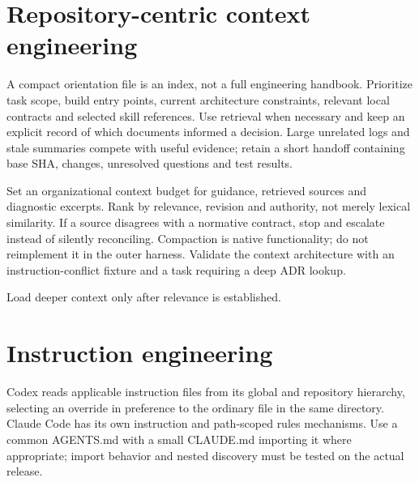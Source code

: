 \documentclass[11pt,letterpaper]{article}
\begin{document}
\section{Repository-centric context engineering}
A compact orientation file is an index, not a full engineering handbook. Prioritize task scope, build entry points, current architecture constraints, relevant local contracts and selected skill references. Use retrieval when necessary and keep an explicit record of which documents informed a decision. Large unrelated logs and stale summaries compete with useful evidence; retain a short handoff containing base SHA, changes, unresolved questions and test results.

Set an organizational context budget for guidance, retrieved sources and diagnostic excerpts. Rank by relevance, revision and authority, not merely lexical similarity. If a source disagrees with a normative contract, stop and escalate instead of silently reconciling. Compaction is native functionality; do not reimplement it in the outer harness. Validate the context architecture with an instruction-conflict fixture and a task requiring a deep ADR lookup.

\begin{center}\begin{minipage}{\linewidth}\captionsetup{type=figure}\centering{}\caption{Progressive disclosure lifecycle}
\small Load deeper context only after relevance is established.\end{minipage}\end{center}
\section{Instruction engineering}
Codex reads applicable instruction files from its global and repository hierarchy, selecting an override in preference to the ordinary file in the same directory. Claude Code has its own instruction and path-scoped rules mechanisms. Use a common AGENTS.md with a small CLAUDE.md importing it where appropriate; import behavior and nested discovery must be tested on the actual release. \cite{oagents,cmem}
\end{document}
